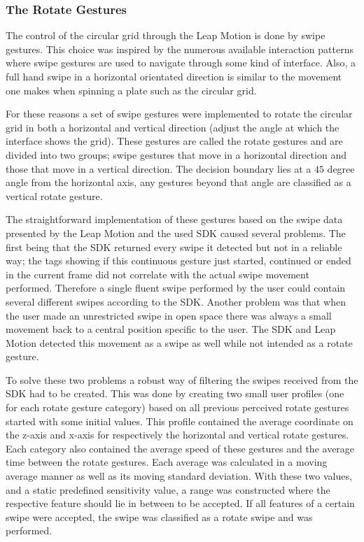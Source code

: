 \subsubsection{The Rotate Gestures}

The control of the circular grid through the Leap Motion is done by
swipe gestures. This choice was inspired by the numerous available
interaction patterns where swipe gestures are used to navigate through
some kind of interface. Also, a full hand swipe in a horizontal orientated
direction is similar to the movement one makes when spinning a plate
such as the circular grid. 

For these reasons a set of swipe gestures were implemented to rotate
the circular grid in both a horizontal and vertical direction (adjust
the angle at which the interface shows the grid). These gestures are
called the rotate gestures and are divided into two groups; swipe
gestures that move in a horizontal direction and those that move in
a vertical direction. The decision boundary lies at a $45$ degree
angle from the horizontal axis, any gestures beyond that angle are
classified as a vertical rotate gesture.

The straightforward implementation of these gestures based on the
swipe data presented by the Leap Motion and the used SDK caused several
problems. The first being that the SDK returned every swipe it detected
but not in a reliable way; the tags showing if this continuous gesture
just started, continued or ended in the current frame did not correlate
with the actual swipe movement performed. Therefore a single fluent
swipe performed by the user could contain several different swipes
according to the SDK. Another problem was that when the user made
an unrestricted swipe in open space there was always a small movement
back to a central position specific to the user. The SDK and Leap
Motion detected this movement as a swipe as well while not intended
as a rotate gesture. 

To solve these two problems a robust way of filtering the swipes received
from the SDK had to be created. This was done by creating two small
user profiles (one for each rotate gesture category) based on all
previous perceived rotate gestures started with some initial values.
This profile contained the average coordinate on the z-axis and x-axis
for respectively the horizontal and vertical rotate gestures. Each
category also contained the average speed of these gestures and the
average time between the rotate gestures. Each average was calculated
in a moving average manner as well as its moving standard deviation.
With these two values, and a static predefined sensitivity value,
a range was constructed where the respective feature should lie in
between to be accepted. If all features of a certain swipe were accepted,
the swipe was classified as a rotate swipe and was performed. 

